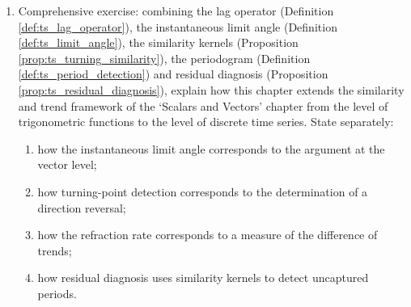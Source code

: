 \begin{enumerate}[leftmargin=3em, label=\textbf{Exercise \arabic*}]
    \item Comprehensive exercise: combining the lag operator (Definition \ref{def:ts_lag_operator}),
    the instantaneous limit angle (Definition \ref{def:ts_limit_angle}),
    the similarity kernels (Proposition \ref{prop:ts_turning_similarity}),
    the periodogram (Definition \ref{def:ts_period_detection})
    and residual diagnosis (Proposition \ref{prop:ts_residual_diagnosis}),
    explain how this chapter extends the similarity and trend framework
    of the `Scalars and Vectors' chapter
    from the level of trigonometric functions to the level of discrete time series.
    State separately:
    \begin{enumerate}[label=(\roman*)]
        \item how the instantaneous limit angle corresponds to the argument at the vector level;
        \item how turning-point detection corresponds to the determination of a direction reversal;
        \item how the refraction rate corresponds to a measure of the difference of trends;
        \item how residual diagnosis uses similarity kernels to detect uncaptured periods.
    \end{enumerate}
\end{enumerate}
